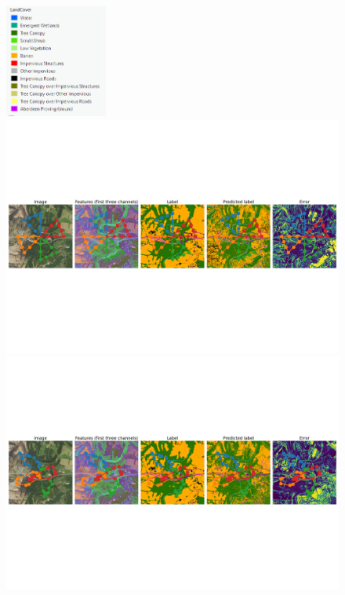 \begin{figure}
    \centering
    \includegraphics[width=0.3\textwidth]{figs/results/ipp/chesapeake/chesapeake_classes.png}\\
    \includegraphics[width=\textwidth, trim={0 16cm 0 16cm}, clip]{figs/results/ipp/4000/paired_qual/coverage.png}
    \includegraphics[width=\textwidth, trim={0 16cm 0 16cm}, clip]{figs/results/ipp/4000/paired_qual/raptors.png}

\end{figure}
